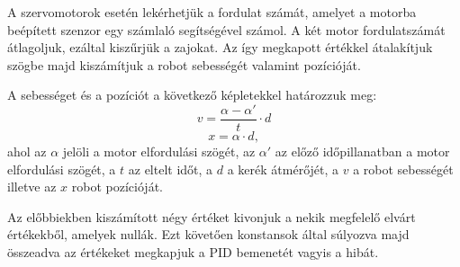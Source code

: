 A szervomotorok esetén lekérhetjük a fordulat számát, amelyet a motorba beépített szenzor egy számlaló segítségével számol. A két motor fordulatszámát átlagoljuk, ezáltal kiszűrjük a zajokat. Az így megkapott értékkel átalakítjuk szögbe majd kiszámítjuk a robot sebességét valamint pozícióját.

A sebességet és a pozíciót a következő képletekkel határozzuk meg:$$v=\frac{\alpha-\alpha'}{t}\cdot d$$ $$x=\alpha\cdot d, $$ ahol az $\alpha$ jelöli a motor elfordulási szögét, az $\alpha'$ az előző időpillanatban a motor elfordulási szögét, a $t$ az eltelt időt, a $d$ a kerék átmérőjét, a $v$ a robot sebességét illetve az $x$ robot pozícióját.

Az előbbiekben kiszámított négy értéket kivonjuk a nekik megfelelő elvárt értékekből, amelyek nullák. Ezt követően konstansok által súlyozva majd összeadva az értékeket megkapjuk a PID bemenetét vagyis a hibát.